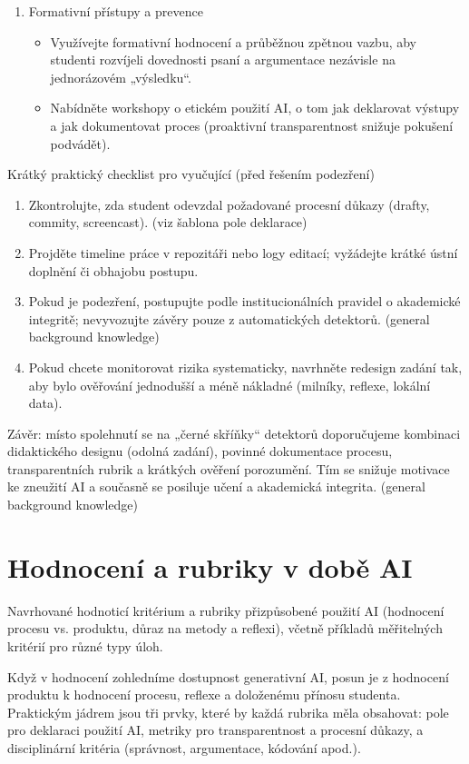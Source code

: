 \documentclass{report}%
\begin{document}
\begin{enumerate}
  \item Formativní přístupy a prevence
    \begin{itemize}
      \item Využívejte formativní hodnocení a průběžnou zpětnou vazbu, aby studenti rozvíjeli dovednosti psaní a argumentace nezávisle na jednorázovém „výsledku“.
      \item Nabídněte workshopy o etickém použití AI, o tom jak deklarovat výstupy a jak dokumentovat proces (proaktivní transparentnost snižuje pokušení podvádět).
    \end{itemize}
\end{enumerate}

\bigskip

\noindent
Krátký praktický checklist pro vyučující (před řešením podezření)
\begin{enumerate}
  \item Zkontrolujte, zda student odevzdal požadované procesní důkazy (drafty, commity, screencast). (viz šablona pole deklarace)
  \item Projděte timeline práce v repozitáři nebo logy editací; vyžádejte krátké ústní doplnění či obhajobu postupu.
  \item Pokud je podezření, postupujte podle institucionálních pravidel o akademické integritě; nevyvozujte závěry pouze z automatických detektorů. (general background knowledge)
  \item Pokud chcete monitorovat rizika systematicky, navrhněte redesign zadání tak, aby bylo ověřování jednodušší a méně nákladné (milníky, reflexe, lokální data).
\end{enumerate}

\bigskip

\noindent
Závěr: místo spolehnutí se na „černé skříňky“ detektorů doporučujeme kombinaci didaktického designu (odolná zadání), povinné dokumentace procesu, transparentních rubrik a krátkých ověření porozumění. Tím se snižuje motivace ke zneužití AI a současně se posiluje učení a akademická integrita. (general background knowledge)%

%
\section{Hodnocení a rubriky v době AI}%
Navrhované hodnoticí kritérium a rubriky přizpůsobené použití AI (hodnocení procesu vs. produktu, důraz na metody a reflexi), včetně příkladů měřitelných kritérií pro různé typy úloh.%


%
Když v hodnocení zohledníme dostupnost generativní AI, posun je z hodnocení produktu k hodnocení procesu, reflexe a doloženému přínosu studenta. Praktickým jádrem jsou tři prvky, které by každá rubrika měla obsahovat: pole pro deklaraci použití AI, metriky pro transparentnost a procesní důkazy, a disciplinární kritéria (správnost, argumentace, kódování apod.).
\end{document}
